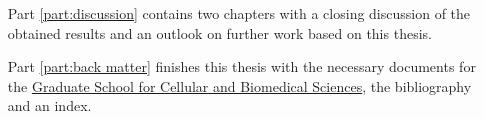 \begin{itemize}
\begin{itemize}
	\end{itemize}
	\item [Part \ref{part:discussion}] contains two chapters with a closing discussion of the obtained results and an outlook on further work based on this thesis.
	\item [Part \ref{part:back matter}] finishes this thesis with the necessary documents for the \href{http://www.gcb.unibe.ch}{Graduate School for Cellular and Biomedical Sciences}, the bibliography and an index.
\end{itemize}